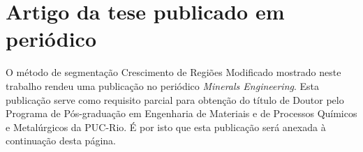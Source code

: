 
\appendix
\chapter{Artigo da tese publicado em periódico}

O método de segmentação Crescimento de Regiões Modificado mostrado neste
trabalho rendeu uma publicação no periódico \textit{Minerals
  Engineering}. Esta publicação serve como requisito parcial para
obtenção do título de Doutor pelo Programa de Pós-graduação em
Engenharia de Materiais e de Processos Químicos e Metalúrgicos da
PUC-Rio. É por isto que esta publicação será anexada à continuação desta
página.

